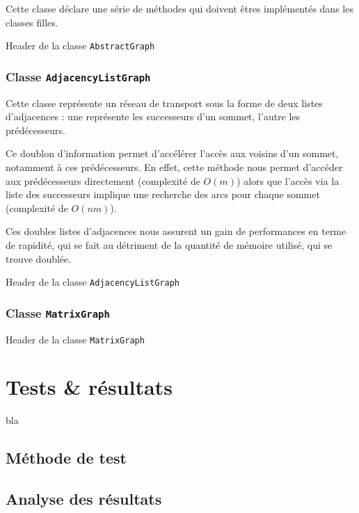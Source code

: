 Cette classe déclare une série de méthodes qui doivent êtres implémentés dans les classes filles.

Header de la classe \texttt{AbstractGraph}



\subsubsection{Classe \texttt{AdjacencyListGraph}}
Cette classe représente un réseau de transport sous la forme
de deux listes d'adjacences : une représente les 
successeurs d'un sommet, l'autre les prédécesseurs.

Ce doublon d'information permet d'accélérer l'accès aux voisins d'un sommet, notamment à ces prédécesseurs. En effet, cette méthode nous permet d'accéder aux prédécesseurs directement (complexité de $O(m)$) alors que l'accès via la liste des successeurs implique une recherche des arcs pour chaque sommet (complexité de $O(nm)$).

Ces doubles listes d'adjacences nous assurent un gain de performances en terme de rapidité, qui se fait au détriment de la quantité de mémoire utilisé, qui se trouve doublée.

Header de la classe \texttt{AdjacencyListGraph}




\subsubsection{Classe \texttt{MatrixGraph}}

Header de la classe \texttt{MatrixGraph}




\section{Tests \& résultats}
bla
\subsection{Méthode de test}

\subsection{Analyse des résultats}

